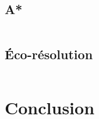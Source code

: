\documentclass{beamer}
\begin{document}
        \subsection{A*}
            \begin{frame}
                \begin{columns}[t]
                    \begin{column}{5cm}
                        \tableofcontents[sections={1-4}, currentsubsection]
                    \end{column}
                    \begin{column}{5cm}
                        \tableofcontents[sections={5-8}, currentsubsection]
                    \end{column}
                \end{columns}
            \end{frame}
        	
        \subsection{Éco-résolution}
            \begin{frame}
                \begin{columns}[t]
                    \begin{column}{5cm}
                        \tableofcontents[sections={1-4}, currentsubsection]
                    \end{column}
                    \begin{column}{5cm}
                        \tableofcontents[sections={5-8}, currentsubsection]
                    \end{column}
                \end{columns}
            \end{frame}
        	
        	
    \section{Conclusion}
        \subsection{}
            
\end{document}
